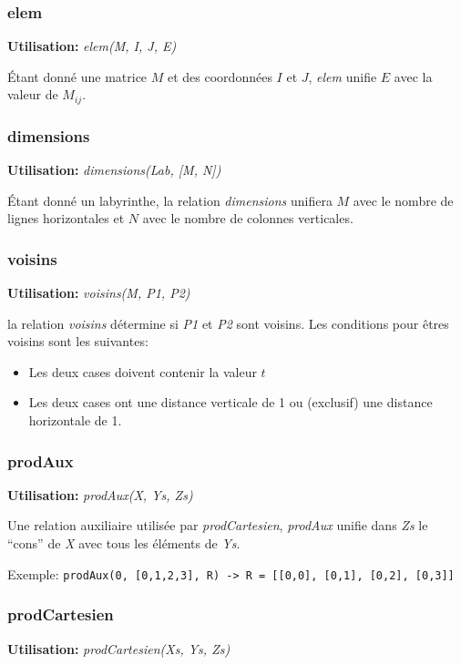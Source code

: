 \documentclass[10pt]{article}
\newcommand{\usage}[1]{\textbf{Utilisation: }\emph{#1}}
\begin{document}
\subsubsection{elem}

\usage{elem(M, I, J, E)}

Étant donné une matrice $M$ et des coordonnées $I$ et $J$, \emph{elem}
unifie $E$ avec la valeur de $M_{ij}$.

\subsubsection{dimensions}

\usage{dimensions(Lab, [M, N])}

Étant donné un labyrinthe, la relation \emph{dimensions} unifiera $M$
avec le nombre de lignes horizontales et $N$ avec le nombre de
colonnes verticales.


\subsubsection{voisins}

\usage{voisins(M, P1, P2)}

la relation \emph{voisins} détermine si \emph{P1} et \emph{P2} sont
voisins.  Les conditions pour êtres voisins sont les suivantes:
\begin{itemize}
\item Les deux cases doivent contenir la valeur $t$
\item Les deux cases ont une distance verticale de 1 ou (exclusif) une
  distance horizontale de 1.
\end{itemize}


\subsubsection{prodAux}

\usage{prodAux(X, Ys, Zs)}

Une relation auxiliaire utilisée par \emph{prodCartesien},
\emph{prodAux} unifie dans \emph{Zs} le ``cons'' de \emph{X} avec tous
les éléments de \emph{Ys}.

Exemple: \texttt{prodAux(0, [0,1,2,3], R) -> R = [[0,0], [0,1], [0,2],
    [0,3]]}

\subsubsection{prodCartesien}

\usage{prodCartesien(Xs, Ys, Zs)}
\end{document}
